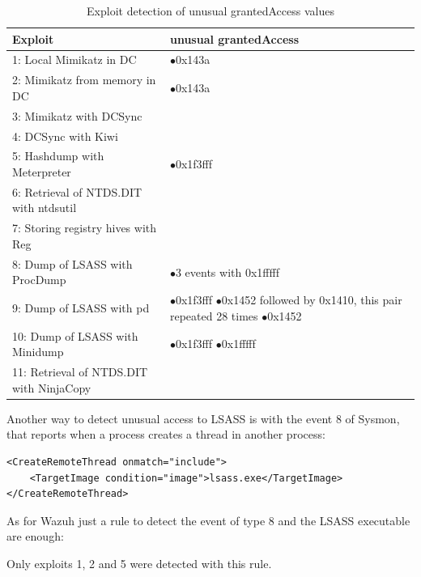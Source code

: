 \begin{table}[H]
	\begin{tabularx}{\textwidth}{|l|X|}
		\hline
		\rowcolor{gray!30}
		Exploit & unusual grantedAccess\\ \hline
		1: Local Mimikatz in DC& \cellcolor{green!60}$\bullet$0x143a\\ \hline
		2: Mimikatz from memory in DC& \cellcolor{green!60} $\bullet$0x143a\\ \hline
		3: Mimikatz with DCSync& \cellcolor{red!60}\\ \hline
		4: DCSync with Kiwi& \cellcolor{red!60}\\ \hline
		5: Hashdump with Meterpreter& \cellcolor{green!60}$\bullet$0x1f3fff\\ \hline
		6: Retrieval of NTDS.DIT with ntdsutil& \cellcolor{red!60}\\ \hline
		7: Storing registry hives with Reg& \cellcolor{red!60}\\ \hline
		8: Dump of LSASS with ProcDump& \cellcolor{green!60}$\bullet$3 events with 0x1fffff\\ \hline
		9: Dump of LSASS with pd& \cellcolor{green!60}
			$\bullet$0x1f3fff \linej
			$\bullet$0x1452 followed by 0x1410, this pair repeated 28 times \linej
			$\bullet$0x1452 \\ \hline
		10: Dump of LSASS with Minidump& \cellcolor{green!60}
			$\bullet$0x1f3fff \linej
			$\bullet$0x1fffff \\ \hline
		11: Retrieval of NTDS.DIT with NinjaCopy& \cellcolor{red!60}\\ \hline
	\end{tabularx}
	\caption{Exploit detection of unusual grantedAccess values}
\end{table}
\linej
Another way to detect unusual access to LSASS is with the event 8 of Sysmon\cite{detection_events}, that reports when a process creates a thread in another process:
\begin{lstlisting}[style=xml]
<CreateRemoteThread onmatch="include">
	<TargetImage condition="image">lsass.exe</TargetImage>
</CreateRemoteThread>
\end{lstlisting}
\linej
As for Wazuh just a rule to detect the event of type 8 and the LSASS executable are enough:

\linej
Only exploits 1, 2 and 5 were detected with this rule.

